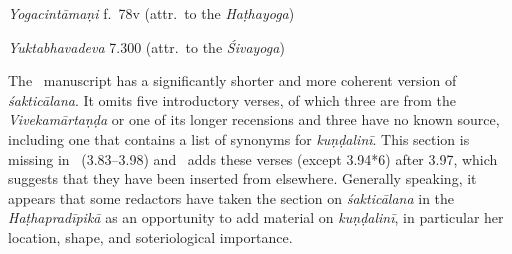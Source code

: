 \begin{ekdosis}
\begin{testimonia}[hp03_094_2]
\emph{Yogacintāmaṇi} f.~78v (attr.~to the \emph{Haṭhayoga})
\begin{versinnote}
\end{versinnote}

\emph{Yuktabhavadeva} 7.300 (attr.~to the \emph{Śivayoga})
\begin{versinnote}
\end{versinnote}


\end{testimonia}

\begin{philcomm}[hp03_094_2]
The \alphaThree\ manuscript has a significantly shorter and more coherent version of \emph{śakticālana}. It omits five introductory verses, of which three are from the \emph{Vivekamārtaṇḍa} or one of its longer recensions and three have no known source, including one that contains a list of synonyms for \emph{kuṇḍalinī}. This section is missing in \alphaOne\ (3.83–3.98) and \alphaTwo\ adds these verses (except 3.94*6) after 3.97, which suggests that they have been inserted from elsewhere. Generally speaking, it appears that some redactors have taken the section on \emph{śakticālana} in the \emph{Haṭhapradīpikā} as an opportunity to add material on \emph{kuṇḍalinī}, in particular her location, shape, and soteriological importance. 


\end{philcomm}
\end{ekdosis}
